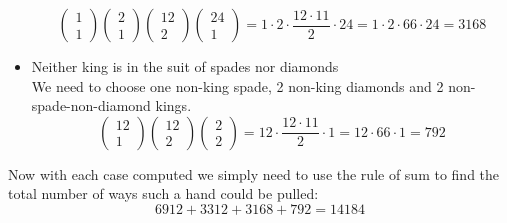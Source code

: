 \documentclass{article}
\begin{document}
\begin{itemize}
$$\begin{pmatrix}
        1\\1
    \end{pmatrix}\begin{pmatrix}
        2\\1
    \end{pmatrix}\begin{pmatrix}
        12\\2
    \end{pmatrix}\begin{pmatrix}
        24\\1
    \end{pmatrix}=1\cdot 2\cdot \frac{12\cdot 11}{2}\cdot 24=1\cdot 2\cdot 66\cdot 24=3168$$
    \item Neither king is in the suit of spades nor diamonds\\
    We need to choose one non-king spade, 2 non-king diamonds and 2 non-spade-non-diamond kings.$$\begin{pmatrix}
        12\\1
    \end{pmatrix}\begin{pmatrix}
        12\\2
    \end{pmatrix}\begin{pmatrix}
        2\\2
    \end{pmatrix}=12\cdot \frac{12\cdot 11}{2}\cdot 1=12\cdot 66\cdot 1=792$$
\end{itemize}
Now with each case computed we simply need to use the rule of sum to find the total number of ways such a hand could be pulled: $$6912+3312+3168+792=\boxed{14184}$$

\newpage
\end{document}
